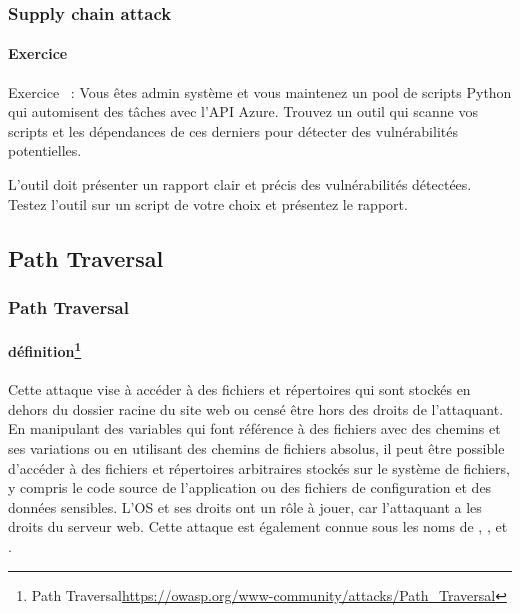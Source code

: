 \documentclass{beamer}
\begin{document}
    \begin{frame}
        \frametitle{Supply chain attack}
        \framesubtitle{Exercice}
        Exercice \execcounterdispinc{}~:
        Vous êtes admin système et vous maintenez un pool de scripts Python qui automisent des tâches avec l'API Azure.
        \bigbreak
        Trouvez un outil qui scanne vos scripts et les dépendances de ces derniers pour détecter des vulnérabilités potentielles.

        L'outil doit présenter un rapport clair et précis des vulnérabilités détectées.
        \bigbreak
        Testez l'outil sur un script de votre choix et présentez le rapport.
    \end{frame}

    \subsection{Path Traversal}\label{path-traversal}


    \begin{frame}
        \frametitle{Path Traversal}
        \framesubtitle{définition\footnote{Path Traversal\url{https://owasp.org/www-community/attacks/Path_Traversal}}}
        \transdissolve
        Cette attaque vise à accéder à des fichiers et répertoires qui sont stockés en dehors du dossier racine du site web ou censé être hors des droits de l'attaquant.
        En manipulant des variables qui font référence à des fichiers avec des chemins  et ses variations ou en utilisant des chemins de fichiers absolus, il peut être possible d'accéder à des fichiers et répertoires arbitraires stockés sur le système de fichiers, y compris le code source de l'application ou des fichiers de configuration et des données sensibles.
        L'OS et ses droits ont un rôle à jouer, car l'attaquant a les droits du serveur web.
        \bigbreak
        Cette attaque est également connue sous les noms de , ,  et .
    \end{frame}
\end{document}
